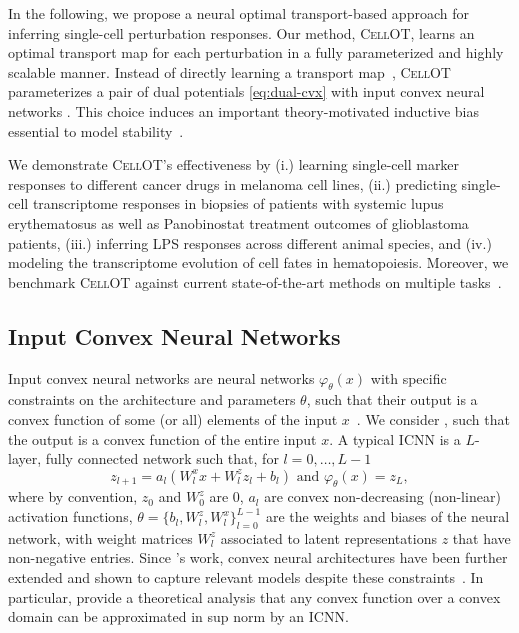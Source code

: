  In the following, we propose a neural optimal transport-based approach for inferring single-cell perturbation responses. 
Our method, \textsc{CellOT}, learns an optimal transport map for each perturbation in a fully parameterized and highly scalable manner. Instead of directly learning a transport map~\citep{korotin2021wasserstein, yang2018scalable, prasad2020optimal}, \textsc{CellOT} parameterizes a pair of dual potentials \eqref{eq:dual-cvx} with input convex neural networks \citep{amos2017input}. This choice induces an important theory-motivated inductive bias essential to model stability~\citep{makkuva2020optimal}. 

 We demonstrate \textsc{CellOT}'s effectiveness by (i.) learning single-cell marker responses to different cancer drugs in melanoma cell lines, (ii.) predicting single-cell transcriptome responses in biopsies of patients with systemic lupus erythematosus as well as Panobinostat treatment outcomes of glioblastoma patients, (iii.) inferring \acrfull{LPS} responses across different animal species, and (iv.) modeling the transcriptome evolution of cell fates in hematopoiesis. Moreover, we benchmark \textsc{CellOT} against current state-of-the-art methods on multiple tasks~\citep{lopez2018scvi, lotfollahi2019scgen, chen2020dissecting}.


\subsection{Input Convex Neural Networks}
\label{sec:icnns}

Input convex neural networks are neural networks $\varphi_\theta(x)$ with specific constraints on the architecture and parameters $\theta$, such that their output is a convex function of some (or all) elements of the input $x$~\citep{amos2017input}. We consider  , such that the output is a convex function of the entire input $x$. A typical \acrshort{ICNN} is a $L$-layer, fully connected network such that, for $l = 0, \dots, L-1$
\begin{equation} \label{eq:icnn}
    z_{l+1} = a_l(W^x_lx + W^z_l z_l + b_l)  \text{ and } \varphi_\theta(x) = z_L,
\end{equation}
where by convention, $z_0$ and $W^z_0$ are $0$, $a_l$ are convex non-decreasing (non-linear) activation functions, $\theta=\{b_l, W^z_l, W^x_l\}_{l=0}^{L-1}$ are the weights and biases of the neural network, with weight matrices $W^z_l$ associated to latent representations $z$ that have non-negative entries. Since \citet{amos2017input}'s work, convex neural architectures have been further extended and shown to capture relevant models despite these constraints~\citep{amos2017input, makkuva2020optimal, huang2021convex}. In particular, \citet{chen2018optimal} provide a theoretical analysis that any convex function over a convex domain can be approximated in sup norm by an \acrshort{ICNN}.


